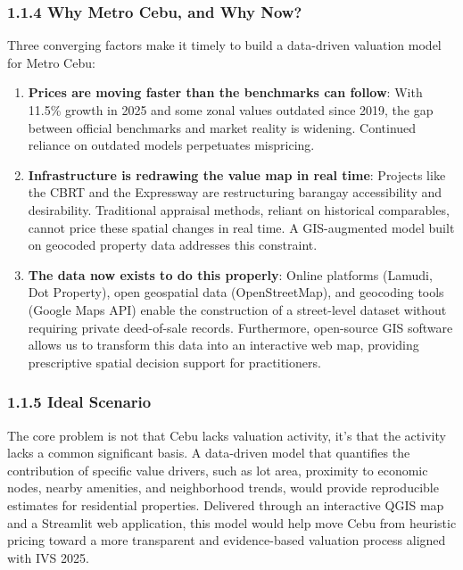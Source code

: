 \subsubsection{\texorpdfstring{\textbf{1.1.4 Why Metro Cebu, and Why Now?}}{1.1.4 Why Metro Cebu, and Why Now?}}\label{why-metro-cebu-and-why-now}

Three converging factors make it timely to build a data-driven valuation model for Metro Cebu:

\begin{enumerate}
\item \textbf{Prices are moving faster than the benchmarks can follow}: With 11.5\% growth in 2025 and some zonal values outdated since 2019, the gap between official benchmarks and market reality is widening. Continued reliance on outdated models perpetuates mispricing.
\item \textbf{Infrastructure is redrawing the value map in real time}: Projects like the CBRT and the Expressway are restructuring barangay accessibility and desirability. Traditional appraisal methods, reliant on historical comparables, cannot price these spatial changes in real time. A GIS-augmented model built on geocoded property data addresses this constraint.
\item \textbf{The data now exists to do this properly}: Online platforms (Lamudi, Dot Property), open geospatial data (OpenStreetMap), and geocoding tools (Google Maps API) enable the construction of a street-level dataset without requiring private deed-of-sale records. Furthermore, open-source GIS software allows us to transform this data into an interactive web map, providing prescriptive spatial decision support for practitioners.
\end{enumerate}

\subsubsection{\texorpdfstring{\textbf{1.1.5 Ideal Scenario}}{1.1.5 Ideal Scenario}}\label{ideal-scenario}

The core problem is not that Cebu lacks valuation activity, it's that the activity lacks a common significant basis. A data-driven model that quantifies the contribution of specific value drivers, such as lot area, proximity to economic nodes, nearby amenities, and neighborhood trends, would provide reproducible estimates for residential properties. Delivered through an interactive QGIS map and a Streamlit web application, this model would help move Cebu from heuristic pricing toward a more transparent and evidence-based valuation process aligned with IVS 2025.

